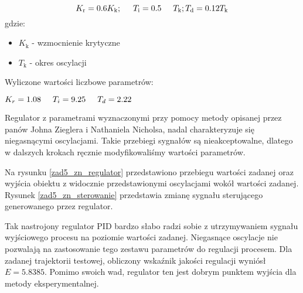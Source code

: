 \begin{equation}
\label{zad5_zn_wzory}
K_{\mathrm{r}}=\num{0,6}K_{\mathrm{k}}; \hspace{0.5 cm} T_{\mathrm{i}}=\num{0,5} \hspace{0.5 cm} T_{\mathrm{k}}; T_{\mathrm{d}}=\num{0,12} T_{\mathrm{k}}
\end{equation}
gdzie:
\begin{center}
\begin{itemize}
    \item $K_{\mathrm{k}}$ - wzmocnienie krytyczne
    \item $T_{\mathrm{k}}$ - okres oscylacji
\end{itemize}
\end{center}

Wyliczone wartości liczbowe parametrów:
\begin{center}
$K_{r}=\num{1,08} \hspace{0.5 cm}
T_{i}=\num{9,25}   \hspace{0.5 cm}
T_{d}=\num{2,22}$
\end{center}

Regulator z parametrami wyznaczonymi przy pomocy metody opisanej przez panów Johna Zieglera
i Nathaniela Nicholsa, nadal charakteryzuje się niegasnącymi oscylacjami. Takie 
przebiegi sygnałów są nieakceptowalne, dlatego w dalszych krokach ręcznie modyfikowaliśmy 
wartości parametrów. 

Na rysunku \ref{zad5_zn_regulator} przedstawiono przebiegu wartości zadanej oraz
wyjścia obiektu z widocznie przedstawionymi oscylacjami wokół wartości zadanej.
Rysunek \ref{zad5_zn_sterowanie} przedstawia zmianę sygnału sterującego
generowanego przez regulator.

Tak nastrojony regulator PID bardzo słabo radzi sobie z utrzymywaniem sygnału wyjściowego
procesu na poziomie wartości zadanej. Niegasnące oscylacje nie pozwalają na zastosowanie
tego zestawu parametrów do regulacji procesem. Dla zadanej trajektorii testowej, obliczony 
wskaźnik jakości regulacji wyniósł $E = \num{5,8385}$. Pomimo swoich wad, regulator ten jest 
dobrym punktem wyjścia dla metody eksperymentalnej.

